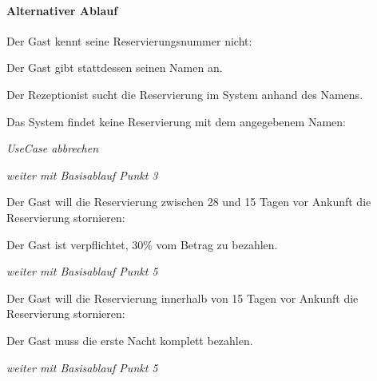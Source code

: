 \paragraph{Alternativer Ablauf}
\begin{longenum}
	\item
	\begin{longenum}
		\item Der \Gls{Gast} kennt seine \Gls{Reservierungsnummer} nicht:
		\begin{longenum}
			\item Der \Gls{Gast} gibt stattdessen seinen Namen an.
			\item Der \Gls{Rezeptionist} sucht die \Gls{Reservierung} im System anhand des Namens.
			\begin{longenum}
				\item Das System findet keine \Gls{Reservierung} mit dem angegebenem Namen:
				\begin{longenum}
					\item \emph{UseCase abbrechen}
				\end{longenum}
			\end{longenum}
			\item \emph{weiter mit Basisablauf Punkt 3}
		\end{longenum}
	\end{longenum}
	
	\item
	\item
	\item
	\begin{longenum}
		\item Der \Gls{Gast} will die Reservierung zwischen 28 und 15 Tagen vor Ankunft die Reservierung stornieren:
		\begin{longenum}
			\item Der \Gls{Gast} ist verpflichtet, 30\% vom Betrag zu bezahlen.
			\item \emph{weiter mit Basisablauf Punkt 5}
		\end{longenum}
		\item Der \Gls{Gast} will die Reservierung innerhalb von 15 Tagen vor Ankunft die Reservierung stornieren:
		\begin{longenum}
			\item Der \Gls{Gast} muss die erste Nacht komplett bezahlen.
			\item \emph{weiter mit Basisablauf Punkt 5}
		\end{longenum}
	\end{longenum}
	
	\item
\end{longenum}

